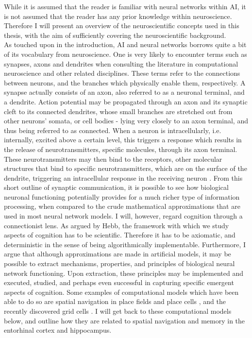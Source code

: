 While it is assumed that the reader is familiar with neural networks within AI, it is not assumed that the reader has any prior knowledge within neuroscience. Therefore I will present an overview of the neuroscientific concepts used in this thesis, with the aim of sufficiently covering the neuroscientific background.
\\

As touched upon in the introduction, AI and neural networks borrows quite a bit of its vocabulary from neuroscience. One is very likely to encounter terms such as synapses, axons and dendrites when consulting the literature in computational neuroscience and other related disciplines. These terms refer to the connections between neurons, and the branches which physically enable them, respectively. A synapse actually consists of an axon, also referred to as a neuronal terminal, and a dendrite. Action potential may be propagated through an axon and its synaptic cleft to its connected dendrites, whose small branches are stretched out from other neurons' somata, or cell bodies - lying very closely to an axon terminal, and thus being referred to as connected. When a neuron is intracellularly, i.e. internally, excited above a certain level, this triggers a response which results in the release of neurotransmitters, specific molecules, through its axon terminal. These neurotransmitters may then bind to the receptors, other molecular structures that bind to specific neurotransmitters, which are on the surface of the dendrite, triggering an intracellular response in the receiving neuron \citep{Campbell2010chpt9}. From this short outline of synaptic communication, it is possible to see how biological neuronal functioning potentially provides for a much richer type of information processing, when compared to the crude mathematical approximations that are used in most neural network models. I will, however, regard cognition through a connectionist lens. As argued by Hebb, the framework with which we study aspects of cognition has to be scientific. Therefore it has to be axiomatic, and deterministic in the sense of being algorithmically implementable. Furthermore, I argue that although approximations are made in artificial models, it may be possible to extract mechanisms, properties, and principles of biological neural network functioning. Upon extraction, these principles may be implemented and executed, studied, and perhaps even successful in capturing specific emergent aspects of cognition. Some examples of computational models which have been able to do so are spatial navigation in place fields and place cells \citep{OKeefe1976, OKeefe1996}, and the recently discovered grid cells \citep{Hafting2005}. I will get back to these computational models below, and outline how they are related to spatial navigation and memory in the entorhinal cortex and hippocampus. 
